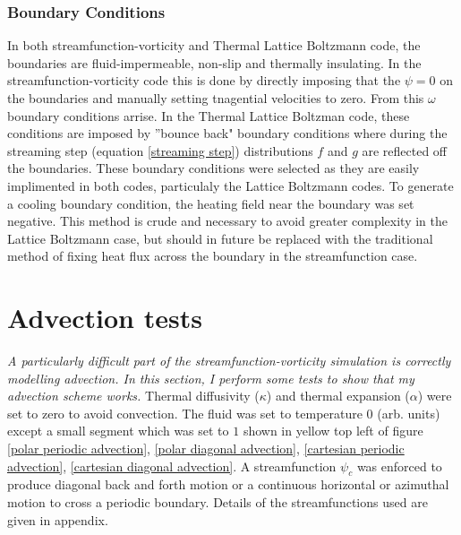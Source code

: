 \documentclass{article}
\begin{document}
\subsubsection*{Boundary Conditions}
In both streamfunction-vorticity and Thermal Lattice Boltzmann code, the boundaries are fluid-impermeable, non-slip and thermally insulating. In the 
streamfunction-vorticity code this is done by directly imposing that the $\psi=0$ on the boundaries and manually setting tnagential velocities to zero. 
From this $\omega$ boundary conditions arrise. In the Thermal Lattice Boltzman code, these conditions are imposed by ''bounce back" boundary conditions 
where during the streaming step (equation \ref{streaming step}) distributions $f$ and $g$ are reflected off the boundaries. These boundary conditions 
were selected as they are easily implimented in both codes, particulaly the Lattice Boltzmann codes. To generate a cooling boundary condition, the 
heating field near the boundary was set negative. This method is crude and necessary to avoid greater complexity in the Lattice Boltzmann case, but 
should in future be replaced with the traditional method of fixing heat flux across the boundary in the streamfunction case.


\section*{Advection tests}
{\it{A particularly difficult part of the streamfunction-vorticity simulation is correctly modelling advection. In this section, I perform some tests to show that my advection scheme works.}}
\vspace{0.3cm}
\newline
\noindent Thermal diffusivity ($\kappa$) and thermal expansion ($\alpha$) were set to zero to avoid convection. The fluid was set to temperature 0 (arb. units) except a small segment which was set to $1$ shown in yellow top left of figure \ref{polar periodic advection}, \ref{polar diagonal advection}, \ref{cartesian periodic advection}, \ref{cartesian diagonal advection}. A streamfunction $\psi_c$ was enforced to produce diagonal back and forth motion or a continuous horizontal or azimuthal motion to cross a periodic boundary. Details of the streamfunctions used are given in appendix.
\end{document}
